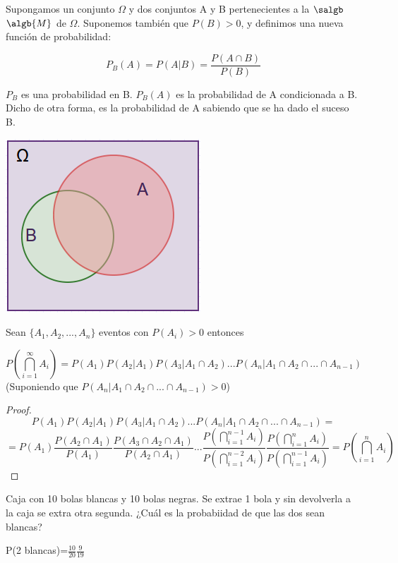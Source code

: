 \documentclass{apuntes}
\begin{document}
\begin{defn}
Supongamos un conjunto $\Omega$ y dos conjuntos A y B pertenecientes a la $\salgb$ $\algb{M}$ de $\Omega$. Suponemos también que $P(B)>0$, y definimos una nueva función de probabilidad:

\[ P_B(A) = P(A | B) = \frac{P(A \cap B)}{P(B)}\]

$P_B$ es una probabilidad en B. $P_B(A)$ es la probabilidad de A condicionada a B. Dicho de otra forma, es la probabilidad de A sabiendo que se ha dado el suceso B.
\end{defn}

\begin{center}
\includegraphics[scale=0.75]{img/Dvenn1.png}
\end{center}

\begin{defn}
Sean $\{A_1, A_2,...,A_n\}$ eventos con $P(A_i)>0$ entonces

\[
P(\bigcap_{i=1}^{\infty}A_i) = P(A_1)P(A_2|A_1)P(A_3|A_1\cap A_2)...P(A_n|A_1\cap A_2\cap ... \cap A_{n-1})
\]
(Suponiendo que $P(A_n|A_1\cap A_2\cap ... \cap A_{n-1})>0$)
\begin{proof}
\[
P(A_1)P(A_2|A_1)P(A_3|A_1\cap A_2)...P(A_n|A_1\cap A_2\cap ... \cap A_{n-1})=
\]
\[
=P(A_1)\frac{P(A_2\cap A_1)}{P(A_1)}\frac{P(A_3\cap A_2\cap A_1)}{P(A_2\cap A_1)}...\frac{P(\bigcap_{i=1}^{n-1}A_i)}{P(\bigcap_{i=1}^{n-2}A_i)}\frac{P(\bigcap_{i=1}^{n}A_i)}{P(\bigcap_{i=1}^{n-1}A_i)} = P(\bigcap_{i=1}^{n}A_i)
\]
\end{proof}
\end{defn}
\begin{example}
Caja con 10 bolas blancas y 10 bolas negras. Se extrae 1 bola y sin devolverla a la caja se extra otra segunda. ¿Cuál es la probabiidad de que las dos sean blancas?

P(2 blancas)=$\frac{10}{20}\frac{9}{19}$
\end{example}
\end{document}
